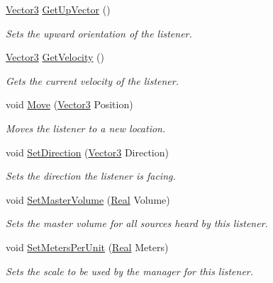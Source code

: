 \begin{DoxyCompactItemize}
\hyperlink{classphys_1_1Vector3}{Vector3} \hyperlink{classphys_1_1SoundListener_aff27f90cad8b2eec53e28d28ee2203c3}{GetUpVector} ()
\begin{DoxyCompactList}\small\item\em Sets the upward orientation of the listener. \item\end{DoxyCompactList}\item 
\hyperlink{classphys_1_1Vector3}{Vector3} \hyperlink{classphys_1_1SoundListener_a6b4bbf974c48ba2028bcf2f943a1b1c2}{GetVelocity} ()
\begin{DoxyCompactList}\small\item\em Gets the current velocity of the listener. \item\end{DoxyCompactList}\item 
void \hyperlink{classphys_1_1SoundListener_a6fb5a26760d0ec460271393fd493dda2}{Move} (\hyperlink{classphys_1_1Vector3}{Vector3} Position)
\begin{DoxyCompactList}\small\item\em Moves the listener to a new location. \item\end{DoxyCompactList}\item 
void \hyperlink{classphys_1_1SoundListener_ad4ba93b650897e355c26b09e3f95bce0}{SetDirection} (\hyperlink{classphys_1_1Vector3}{Vector3} Direction)
\begin{DoxyCompactList}\small\item\em Sets the direction the listener is facing. \item\end{DoxyCompactList}\item 
void \hyperlink{classphys_1_1SoundListener_a8375218557d4a79889bc59da6b064a43}{SetMasterVolume} (\hyperlink{namespacephys_af7eb897198d265b8e868f45240230d5f}{Real} Volume)
\begin{DoxyCompactList}\small\item\em Sets the master volume for all sources heard by this listener. \item\end{DoxyCompactList}\item 
void \hyperlink{classphys_1_1SoundListener_ae5d432f4e1bf7eb788364e7ea0c4e0a6}{SetMetersPerUnit} (\hyperlink{namespacephys_af7eb897198d265b8e868f45240230d5f}{Real} Meters)
\begin{DoxyCompactList}\small\item\em Sets the scale to be used by the manager for this listener. \item\end{DoxyCompactList}\item 

\end{DoxyCompactItemize}
